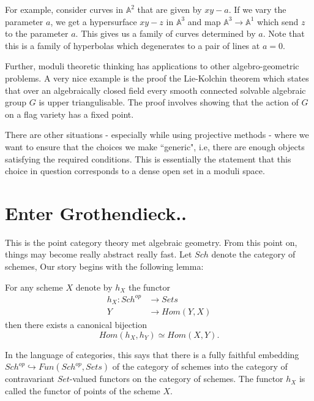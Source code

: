 \documentclass[ignorenonframetext]{beamer}
\newcommand{\A}{{\mathbb A}}
\theoremstyle{definition}
\begin{document}

For example, consider curves in $\A^2$ that are given by $xy - a$. If we vary the parameter $a$, we get a hypersurface $xy-z$ in $\A^3$ and map $\A^3\rightarrow\A^1$ which send $z$ to the parameter $a$. This gives us a family of curves determined by $a$. Note that this is a family of hyperbolas which degenerates to a pair of lines at $a=0$.

Further, moduli theoretic thinking has applications to other algebro-geometric problems. A very nice example is the proof the Lie-Kolchin theorem which states that over an algebraically closed field every smooth connected solvable algebraic group $G$ is upper triangulisable. The proof involves showing that the action of $G$ on a flag variety has a fixed point.

There are other situations - especially while using projective methods - where we want to ensure that the choices we make ``generic", i.e, there are enough objects satisfying the required conditions. This is essentially the statement that this choice in question corresponds to a dense open set in a moduli space.


\section{Enter Grothendieck..}

This is the point category theory met algebraic geometry. From this point on, things may become really abstract really fast. Let $Sch$ denote the category of schemes, Our story begins with the following lemma:
\begin{lemma}[Yoneda]
	For any scheme $X$ denote by $h_X$ the functor
	\begin{align*}
	h_X : Sch^{op} &\rightarrow Sets\\
	Y&\rightarrow Hom(Y,X)
	\end{align*}
	then there exists a canonical bijection
	\[Hom(h_X,h_Y)\simeq Hom(X,Y).\]
\end{lemma}

In the language of categories, this says that there is a fully faithful embedding $Sch^{op}\hookrightarrow Fun(Sch^{op},Sets)$ of the category of schemes into the category of contravariant $Set$-valued functors on the category of schemes. The functor $h_X$ is called the functor of points of the scheme $X$.
\end{document}
